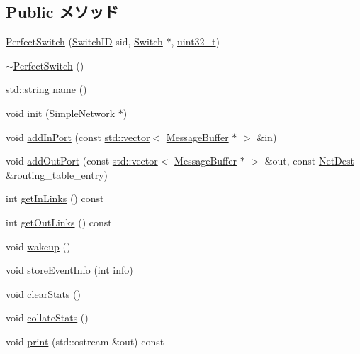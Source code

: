 \subsection*{Public メソッド}
\begin{DoxyCompactItemize}
\item 
\hyperlink{classPerfectSwitch_ae33d3c4e7ad672dcef325947b8c6c306}{PerfectSwitch} (\hyperlink{TypeDefines_8hh_ac925a332c83eaf1e40e056e7a20ebcd8}{SwitchID} sid, \hyperlink{classSwitch}{Switch} $\ast$, \hyperlink{Type_8hh_a435d1572bf3f880d55459d9805097f62}{uint32\_\-t})
\item 
\hyperlink{classPerfectSwitch_a86d266f35b6d2d7f0f7887a31a6e1978}{$\sim$PerfectSwitch} ()
\item 
std::string \hyperlink{classPerfectSwitch_af1801e31af6399bccce114ab12575168}{name} ()
\item 
void \hyperlink{classPerfectSwitch_a2c2a3eb1ad7853288ac72dc245aea836}{init} (\hyperlink{classSimpleNetwork}{SimpleNetwork} $\ast$)
\item 
void \hyperlink{classPerfectSwitch_a1c4c43d5cc554f870b4c7a485fb25c7e}{addInPort} (const \hyperlink{classstd_1_1vector}{std::vector}$<$ \hyperlink{classMessageBuffer}{MessageBuffer} $\ast$ $>$ \&in)
\item 
void \hyperlink{classPerfectSwitch_a79640b497a553306c19f2458ce05d4be}{addOutPort} (const \hyperlink{classstd_1_1vector}{std::vector}$<$ \hyperlink{classMessageBuffer}{MessageBuffer} $\ast$ $>$ \&out, const \hyperlink{classNetDest}{NetDest} \&routing\_\-table\_\-entry)
\item 
int \hyperlink{classPerfectSwitch_a6b34df98756ca04e25a39378d1a7cc06}{getInLinks} () const 
\item 
int \hyperlink{classPerfectSwitch_adb57a9f7220739b3d11d85188ca7e87d}{getOutLinks} () const 
\item 
void \hyperlink{classPerfectSwitch_ae674290a26ecbd622c5160e38e8a4fe9}{wakeup} ()
\item 
void \hyperlink{classPerfectSwitch_accd0665763c9caa446789b27a62f931b}{storeEventInfo} (int info)
\item 
void \hyperlink{classPerfectSwitch_ac7ec7476159db4e2bb0372e30010fc9e}{clearStats} ()
\item 
void \hyperlink{classPerfectSwitch_a208669cbc0bb1d52565956ca8c690c55}{collateStats} ()
\item 
void \hyperlink{classPerfectSwitch_ac55fe386a101fbae38c716067c9966a0}{print} (std::ostream \&out) const 
\end{DoxyCompactItemize}
